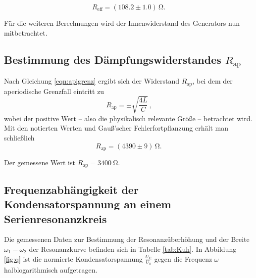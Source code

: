 \begin{equation*}
	R_{\text{eff}}= (108.2 \pm 1.0) \,\si{\ohm} \text{.}
\end{equation*}

Für die weiteren Berechnungen wird der Innenwiderstand des Generators nun mitbetrachtet.

\subsection{Bestimmung des Dämpfungswiderstandes $R_{\text{ap}}$}

Nach Gleichung \eqref{eqn:apigrenz} ergibt sich der Widerstand $R_{\text{ap}}$, bei dem der
aperiodische Grenzfall eintritt zu
\begin{equation}
	R_{\text{ap}} = \pm \sqrt{\frac{4L}{C}} \, \text{,}
	\label{eqn:rap}
\end{equation}
wobei der positive Wert -- also die physikalisch relevante Größe -- betrachtet wird.
Mit den notierten Werten und Gauß'scher Fehlerfortpflanzung erhält man schließlich
\begin{equation*}
	R_{\text{ap}} = (4390 \pm 9) \, \si{\ohm} \text{.}
\end{equation*}

Der gemessene Wert ist $R_{\text{ap}} = \SI{3400}{\ohm}$.
\subsection{Frequenzabhängigkeit der Kondensatorspannung an einem Serienresonanzkreis}
Die gemessenen Daten zur Bestimmung der Resonanzüberhöhung und der Breite $ \omega_1 - \omega_2 $ der Resonanzkurve befinden sich in Tabelle \ref{tab:Kuh}.
In Abbildung \ref{fig:q} ist die normierte Kondensatorspannung $\frac{U_{\mathrm{C}}}{U_{\mathrm{0}}}$ gegen die Frequenz $\omega$ halblogarithmisch aufgetragen.

